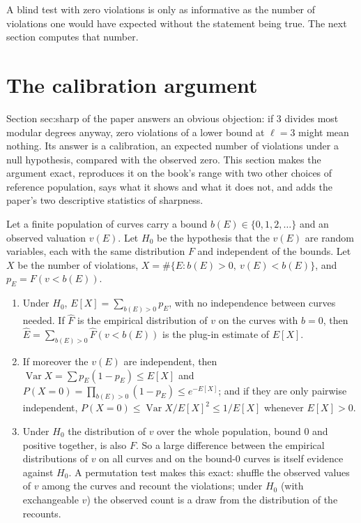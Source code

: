 \begin{sloppypar}
A blind test with zero violations is only as informative as the number of violations one would have expected without the statement being true.
The next section computes that number.
\section{The calibration argument}\label{sec:computation:calibration}

Section sec:sharp of the paper answers an obvious objection: if $3$ divides most modular degrees anyway, zero violations of a lower bound at $\ell=3$
might mean nothing. Its answer is a calibration, an expected number of violations under a null hypothesis, compared with the observed zero. This
section makes the argument exact, reproduces it on the book's range with two other choices of reference population, says what it shows and
what it does not, and adds the paper's two descriptive statistics of sharpness.

\begin{proposition}\label{prop:computation:null-model}
Let a finite population of curves carry a bound $b(E)\in\{0,1,2,\dots\}$ and an observed valuation $v(E)$. Let $H_0$ be the hypothesis that the $v(E)$ are
random variables, each with the same distribution $F$ and independent of the bounds. Let $X$ be the number of violations, $X=\#\{E:b(E)>0,\ v(E)<b(E)\}$, and
$p_E=F(v<b(E))$.
\begin{enumerate}[label=(\roman*)]
\item Under $H_0$, $E[X]=\sum_{b(E)>0}p_E$, with no independence between curves needed. If $\hat F$ is the empirical distribution of $v$ on the curves with
$b=0$, then $\hat E=\sum_{b(E)>0}\hat F(v<b(E))$ is the plug-in estimate of $E[X]$.
\item If moreover the $v(E)$ are independent, then $\operatorname{Var}X=\sum p_E(1-p_E)\le E[X]$ and $P(X=0)=\prod_{b(E)>0}(1-p_E)\le e^{-E[X]}$; and if they are only pairwise
independent, $P(X=0)\le\operatorname{Var}X/E[X]^2\le1/E[X]$ whenever $E[X]>0$.
\item Under $H_0$ the distribution of $v$ over the whole population, bound $0$ and positive together, is also $F$. So a large difference between the
empirical distributions of $v$ on all curves and on the bound-$0$ curves is itself evidence against $H_0$. A permutation test makes this
exact: shuffle the observed values of $v$ among the curves and recount the violations; under $H_0$ (with exchangeable $v$) the observed count is a
draw from the distribution of the recounts.
\end{enumerate}
\end{proposition}


\end{sloppypar}

